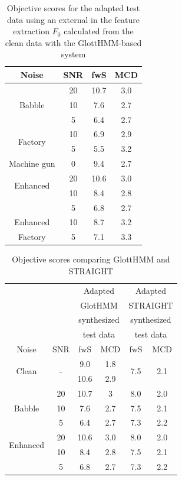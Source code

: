 \begin{table}[!htb]
\begin{center}
\begin{tabular}{c c | c | c}
Noise & SNR & fwS & MCD\\
\midrule
\midrule
\multirow{3}{*}{Babble} & 20 & 10.7 & 3.0\\
 & 10 & 7.6 & 2.7\\
 & 5 & 6.4 & 2.7\\
\midrule
\multirow{2}{*}{Factory} & 10 & 6.9 & 2.9\\
 & 5 & 5.5 & 3.2\\
\midrule
Machine gun & 0 & 9.4 & 2.7\\
\midrule
\midrule
\multirow{2}{*}{Enhanced} & 20 & 10.6 & 3.0\\
\multirow{2}{*}{Babble} & 10 & 8.4 & 2.8\\
& 5 & 6.8 & 2.7\\
\midrule
Enhanced & 10 & 8.7 & 3.2\\
Factory & 5 & 7.1 & 3.3\\
\bottomrule
\end{tabular}
\caption{Objective scores for the adapted test data using an external in the feature extraction $F_{0}$ calculated from the clean data with the GlottHMM-based system}
\label{table:results_ext_f0_glott}
\end{center}
\end{table}

\begin{table}[htb]
\begin{centering}
\begin{tabular}{c c|c c|c c}
	 & & \multicolumn{2}{c|}{Adapted} & \multicolumn{2}{c}{Adapted}\\
	 & & \multicolumn{2}{c|}{GlotHMM} & \multicolumn{2}{c}{STRAIGHT}\\
	 & & \multicolumn{2}{c|}{synthesized} & \multicolumn{2}{c}{synthesized}\\
	 & & \multicolumn{2}{c|}{test data} & \multicolumn{2}{c}{test data}\\
	Noise & SNR & fwS & MCD & fwS & MCD\\
	\midrule
	\midrule
	\multirow{2}{*}{Clean} & \multirow{2}{*}{-} & 9.0 & 1.8 & \multirow{2}{*}{7.5} & \multirow{2}{*}{2.1}\\
	 & & 10.6 & 2.9 & & \\	
	\midrule
	\multirow{3}{*}{Babble} & 20 & 10.7 & 3 & 8.0 & 2.0\\
	 & 10 & 7.6 & 2.7 & 7.5 & 2.1\\
	 & 5 & 6.4 & 2.7 & 7.3 & 2.2\\
	\midrule
	\midrule
	\multirow{2}{*}{Enhanced} & 20 & 10.6 & 3.0 & 8.0 & 2.0\\
	\multirow{2}{*}{Babble} & 10 & 8.4 & 2.8 & 7.5 & 2.1\\
	 & 5 & 6.8 & 2.7 & 7.3 & 2.2\\
	\bottomrule
\end{tabular}
\caption{Objective scores comparing GlottHMM and STRAIGHT}
\label{table:comp_adapt_results}
\end{centering}
\end{table}

